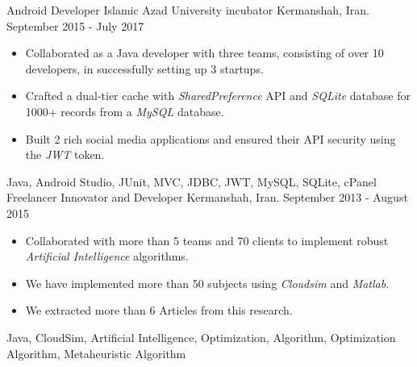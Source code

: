 \begin{experiences}
\emptySeparator

\experience
{}
{Android Developer}
{Islamic Azad University incubator}
{Kermanshah, Iran. \hspace{60 pt} September 2015 - July 2017}
{}
{
\begin{itemize}
\item Collaborated as a Java developer with three teams, consisting of over 10 developers, in successfully setting up 3 startups.
\item Crafted a dual-tier cache with \emph{SharedPreference} API and \emph{SQLite} database for 1000+ records from a \emph{MySQL} database.
\item Built 2 rich social media applications and ensured their API security using the \emph{JWT} token.
\end{itemize}
}{Java, Android Studio, JUnit, MVC, JDBC, JWT, MySQL, SQLite, cPanel}
\experience
{}
{Freelancer Innovator and Developer}
{}
{Kermanshah, Iran. \hspace{140 pt} September 2013 - August 2015}
{}
{
\begin{itemize}
\item Collaborated with more than 5 teams and 70 clients to implement robust \emph{Artificial Intelligence} algorithms.
\item We have implemented more than 50 subjects using \emph{Cloudsim} and \emph{Matlab}.
\item We extracted more than 6 Articles from this research.
\end{itemize}
}{Java, CloudSim, Artificial Intelligence, Optimization, Algorithm, Optimization Algorithm, Metaheuristic Algorithm}
\emptySeparator
\end{experiences}
